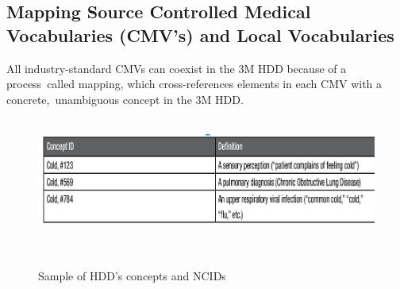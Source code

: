   \subsection{Mapping Source Controlled Medical Vocabularies (CMV's) and Local Vocabularies}
  All industry-standard CMVs can coexist in the 3M HDD because of a process\
  called mapping, which cross-references elements in each CMV with a concrete,\
  unambiguous concept in the 3M HDD.\\
  \citep{_3M_HDD_Product_Overview_2010}\

  \begin{figure}[ht!]
    \label{fig:cid}
    \centering
    \includegraphics[scale=0.4]{conceptid.png}
    \caption{Sample of HDD's concepts and NCIDs}\
    \citep{_3M_HDD_Product_Overview_2010}\
  \end{figure}  
